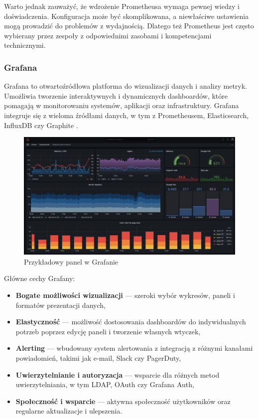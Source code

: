 \documentclass{article}
\begin{document}
Warto jednak zauważyć, że wdrożenie Prometheusa wymaga pewnej wiedzy i doświadczenia. Konfiguracja może być skomplikowana, a niewłaściwe ustawienia mogą prowadzić do problemów z wydajnością. Dlatego też Prometheus jest często wybierany przez zespoły z odpowiednimi zasobami i kompetencjami technicznymi.

\subsubsection{Grafana}

Grafana to otwartoźródłowa platforma do wizualizacji danych i analizy metryk. Umożliwia tworzenie interaktywnych i dynamicznych dashboardów, które pomagają w monitorowaniu systemów, aplikacji oraz infrastruktury. Grafana integruje się z wieloma źródłami danych, w tym z Prometheusem, Elasticsearch, InfluxDB czy Graphite \cite{BizetyGrafana}.

\begin{figure}[H]
    \centering
    \includegraphics[width=1\linewidth]{grafanaPrzyklad.png}
    \caption{Przykładowy panel w Grafanie}
    \label{fig:enter-label}
\end{figure}

Główne cechy Grafany:

\begin{itemize}
    \item \textbf{Bogate możliwości wizualizacji} — szeroki wybór wykresów, paneli i formatów prezentacji danych,
    \item \textbf{Elastyczność} — możliwość dostosowania dashboardów do indywidualnych potrzeb poprzez edycję paneli i tworzenie własnych wtyczek,
    \item \textbf{Alerting} — wbudowany system alertowania z integracją z różnymi kanałami powiadomień, takimi jak e-mail, Slack czy PagerDuty,
    \item \textbf{Uwierzytelnianie i autoryzacja} — wsparcie dla różnych metod uwierzytelniania, w tym LDAP, OAuth czy Grafana Auth,
    \item \textbf{Społeczność i wsparcie} — aktywna społeczność użytkowników oraz regularne aktualizacje i ulepszenia.
\end{itemize}
\end{document}
